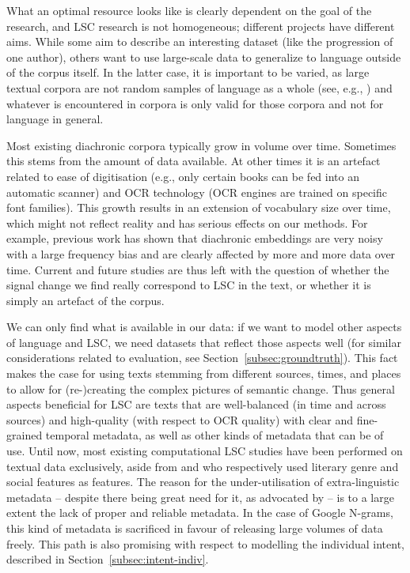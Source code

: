 \documentclass[output=paper]{langscibook}
\begin{document}
What an optimal resource looks like is clearly dependent on the goal of the research, and LSC research is not homogeneous; different projects have different aims. While some aim to describe an interesting dataset (like the progression of one author), others want to use large-scale data to generalize to language outside of the corpus itself. In the latter case, it is important to be varied, as large textual corpora are not random samples of language as a whole (see, e.g., \citealt{koplenig2016}) and whatever is encountered in corpora is only valid for those corpora and not for language in general. 

Most existing diachronic corpora  typically grow in volume over time. Sometimes this stems from the amount of data available. At other times it is an artefact related to ease of digitisation (e.g., only certain books can be fed into an automatic scanner) and OCR technology (OCR engines are trained on specific font families). This growth results in an extension of vocabulary size over time, which might not reflect reality and has serious effects on our methods. For example, previous work has shown that diachronic embeddings are very noisy \citep{hellrich-hahn-2016-bad, dubossarsky-etal-2017-outta, dubossarsky-etal-2019-time, kaiser-etal-2020-ims, schlechtweg-etal-2020-semeval} with a large frequency bias and are clearly affected by more and more data over time. 
Current and future studies are thus left with the question of whether the signal change we find really correspond to LSC in the text, or whether it is simply an artefact of the corpus.

We can only find what is available in our data: if we want to model other aspects of language and LSC, we need datasets that reflect those aspects well (for similar considerations related to evaluation, see Section~\ref{subsec:groundtruth}). This fact makes the case for using texts stemming from different sources, times, and places to allow for (re-)creating the complex pictures of semantic change. Thus general aspects beneficial for LSC are texts that are well-balanced (in time and across sources) and high-quality (with respect to OCR quality) with clear and fine-grained temporal metadata, as well as other kinds of metadata that can be of use. 
Until now, most existing computational LSC studies have been performed on textual data exclusively, aside from \citet{perrone-etal-2019-gasc} and \citet{jawahar-seddah-2019-contextualized} who respectively used literary genre and social features as features. The reason for the under-utilisation of extra-linguistic metadata -- despite there being great need for it, as advocated by \citet{bowern2019semantic} -- is to a large extent the lack of proper and reliable metadata. In the case of Google N-grams, this kind of metadata is sacrificed in favour of releasing  large volumes of data freely. This path is also promising with respect to modelling the individual intent, described in Section~\ref{subsec:intent-indiv}. 
\end{document}
